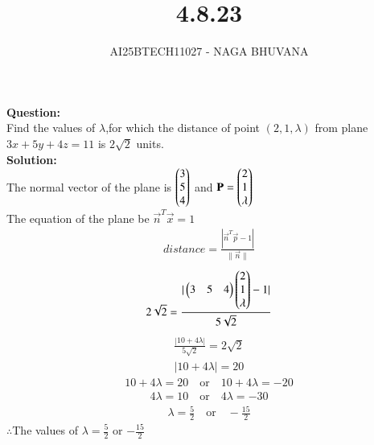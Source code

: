 \documentclass[journal,12pt,onecolumn]{IEEEtran}
\begin{document}
\title{4.8.23}
\author{AI25BTECH11027 - NAGA BHUVANA}
{\let\newpage\relax\maketitle}
\noindent
		\textbf{Question:}\\
Find the values of $\lambda$,for which the distance of point $(2,1,\lambda)$ from plane $3x+5y+4z=11$ is $2\sqrt{2}$ units.\\
\textbf{Solution:}\\
The normal vector of the plane is $\begin{pmatrix}3\\5\\4\end{pmatrix}$ and $\mathbf{P}=\begin{pmatrix}2\\1\\\lambda\end{pmatrix}$\\
The equation of the plane be $\vec{n}^T\vec{x}=1$
\begin{align}
    distance=\frac{|\vec{n}^T\vec{p}-1|}{\|\vec{n}\|}
\end{align}
\begin{align}
    2\sqrt{2}=\frac{|\begin{pmatrix}3&5&4\end{pmatrix}\begin{pmatrix}2\\1\\\lambda\end{pmatrix}-1|}{5\sqrt{2}}
\end{align}
        \begin{align}
            \frac{|10+4\lambda|}{5\sqrt{2}}=2\sqrt{2}
        \end{align}
        \begin{align}
            |10+4\lambda|=20
        \end{align}
        \begin{align}
            10+4\lambda=20  \quad \text{or} \quad 10+4\lambda=-20
        \end{align}
        \begin{align}
            4\lambda=10 \quad \text{or} \quad 4\lambda=-30
        \end{align}
        \begin{align}
            \lambda=\frac{5}{2} \quad \text{or} \quad -\frac{15}{2}
        \end{align}
        $\therefore $The values of $\lambda=\frac{5}{2}$ or $-\frac{15}{2}$
\end{document}
